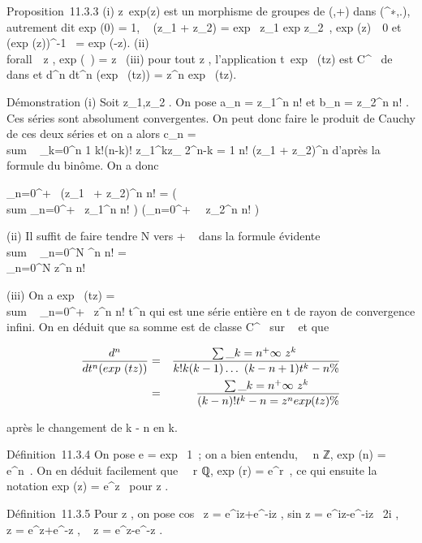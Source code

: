 \documentclass[]{article}
\begin{document}
Proposition~11.3.3 (i) z\mapsto~exp(z) est un
morphisme de groupes de (,+) dans (^∗,.), autrement dit
exp (0) = 1, \exp~
(z\_1 + z\_2) = exp~
z\_1 exp z\_2~,
exp (z)\mathrel\neq~~0 et
(exp (z))^-1~
= exp (-z). (ii) \\forall~~z
\in {}, exp (\overlinez~) =
\overlineexp z~ (iii) pour
tout z \in {}, l'application
t\mapsto~exp~ (tz) est
C^\infty~ de ~ dans  et  d^n \over
dt^n (exp~ (tz)) =
z^n exp~ (tz).

Démonstration (i) Soit z\_1,z\_2 \in {}. On pose
a\_n = z\_1^n \over n! et
b\_n = z\_2^n \over n! . Ces
séries sont absolument convergentes. On peut donc faire le produit de
Cauchy de ces deux séries et on a alors c\_n
= \\sum ~
\_k=0^n 1 \over k!(n-k)!
z\_1^kz\_ 2^n-k = 1 \over
n! (z\_1 + z\_2)^n d'après la formule du
binôme. On a donc

\sum \_n=0^+\infty~ (z\_1~ +
z\_2)^n \over n! =
\left (\\sum
\_n=0^+\infty~ z\_1^n \over
n! \right )\left
(\sum \_n=0^+\infty~~
z\_2^n \over n! \right )

(ii) Il suffit de faire tendre N vers + \infty~ dans la formule évidente
\\sum ~
\_n=0^N \overlinez^n
\over n! =
\overline\\\sum
 \_n=0^N z^n \over n! 

(iii) On a exp~ (tz)
= \\sum ~
\_n=0^+\infty~ z^n \over n!
t^n qui est une série entière en t de rayon de convergence
infini. On en déduit que sa somme est de classe C^\infty~ sur ~ et
que

\begin{align*} d^n \over
dt^n (exp~ (tz))& =&
\sum \_k=n^+\infty~ z^k~
\over k! k(k - 1)\ldots~(k -
n + 1)t^k-n\%& \\ & =&
\sum \_k=n^+\infty~ z^k~
\over (k - n)! t^k-n = z^n exp
(tz) \%& \\
\end{align*}

après le changement de k - n en k.

Définition~11.3.4 On pose e = exp~ 1~; on a
bien entendu, \forall~~n \in ℤ,
exp (n) = e^n~. On en déduit
facilement que \forall~~r \in ℚ,
exp (r) = e^r~, ce qui \jmathustifie
ensuite la notation exp (z) = e^z~
pour z \in {}.

Définition~11.3.5 Pour z \in {}, on pose cos~ z
= e^iz+e^-iz  ,
sin z = e^iz-e^-iz~
\over 2i ,
\mathrmch~ z =
e^z+e^-z  ,
\mathrmsh~ z =
e^z-e^-z  .
\end{document}

